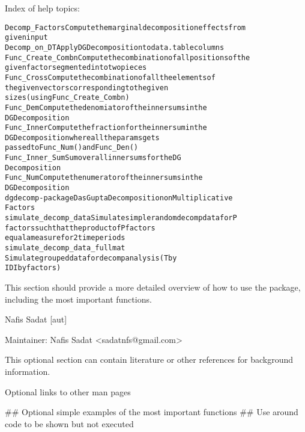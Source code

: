 \documentclass[a4paper]{book}
\begin{document}
\begin{Details}
Index of help topics:
\begin{alltt}
Decomp_Factors          Compute the marginal decomposition effects from
                        given input
Decomp_on_DT            Apply DG Decomposition to data.table columns
Func_Create_Combn       Compute the combination of all positions of the
                        given factor segmented into two pieces
Func_Cross              Compute the combination of all the elements of
                        the given vectors corresponding to the given
                        sizes (using Func_Create_Combn)
Func_Dem                Compute the denomiator of the inner sums in the
                        DG Decomposition
Func_Inner              Compute the fraction for the inner sum in the
                        DG Decomposition where all the params gets
                        passed to Func_Num() and Func_Den()
Func_Inner_Sum          Sum over all inner sums for the DG
                        Decomposition
Func_Num                Compute the numerator of the inner sums in the
                        DG Decomposition
dgdecomp-package        Das Gupta Decomposition on Multiplicative
                        Factors
simulate_decomp_data    Simulate simple random decomp data for P
                        factors such that the product of P factors
                        equal a measure for 2 time periods
simulate_decomp_data_fullmat
                        Simulate grouped data for decomp analysis (T by
                        IDI by factors)
\end{alltt}


This section should provide a more detailed overview of how to use the
package, including the most important functions.
\end{Details}
%
\begin{Author}\relax
Nafis Sadat [aut]

Maintainer: Nafis Sadat <sadatnfs@gmail.com>
\end{Author}
%
\begin{References}\relax
This optional section can contain literature or other references for
background information.
\end{References}
%
\begin{SeeAlso}\relax
Optional links to other man pages
\end{SeeAlso}
%
\begin{Examples}
\begin{ExampleCode}
  ## Optional simple examples of the most important functions
  ## Use \dontrun{} around code to be shown but not executed
\end{ExampleCode}
\end{Examples}
\end{document}
